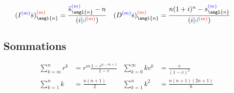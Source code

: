 \documentclass[10pt, french]{article}
\newcommand\cumlaut[2][black]{\stackon[.33ex]{#2}{\textcolor{#1}{\kern-.04ex.\kern-.2ex.}}}
\begin{document}
\begin{multicols*}{3}
\begin{align*}
	(I^{\textcolor{blue}{(m)}}\cumlaut[cyan]{s})_{\angl{n}}^{\textcolor{red}{(m)}} 
		&= \frac{\cumlaut[black]{s}_{\angl{n}}^{\textcolor{blue}{(m)}} - n}{(i | \textcolor{cyan}{d}^{\textcolor{red}{(m)}})} &
	(D^{\textcolor{blue}{(m)}}\cumlaut[cyan]{s})_{\angl{n}}^{\textcolor{red}{(m)}} 
		&= \frac{n(1+i)^{n} - s_{\angl{n}}^{\textcolor{blue}{(m)}}}{(i | \textcolor{cyan}{d}^{\textcolor{red}{(m)}})} 
\end{align*}




\setlength{\mathindent}{1cm}

\subsection*{Sommations}
\begin{align*}
\sum_{k = m}^{n} r^k &= r^{m} \frac{1 - r^{n - m + 1}}{1 - r} &
\sum_{k = 0}^{\infty}k v^k &= \frac{v}{(1 - v)^2} \\
\sum_{k = 1}^{n}k &= \frac{n(n + 1)}{2} &
\sum_{k = 1}^{n}k^2 &= \frac{n(n + 1)(2n + 1)}{6} \\
\end{align*}


\end{multicols*}
\end{document}

